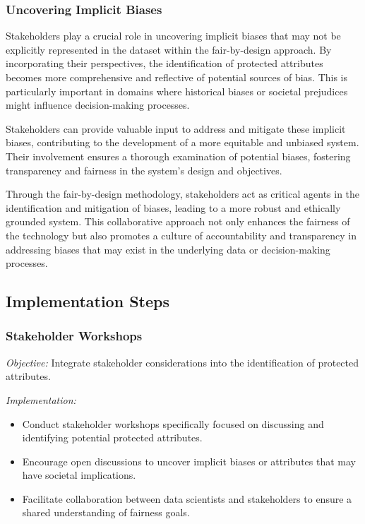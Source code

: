 \subsubsection{Uncovering Implicit Biases}


Stakeholders play a crucial role in uncovering implicit biases that may not be explicitly represented in the dataset within the fair-by-design approach. By incorporating their perspectives, the identification of protected attributes becomes more comprehensive and reflective of potential sources of bias. This is particularly important in domains where historical biases or societal prejudices might influence decision-making processes.

Stakeholders can provide valuable input to address and mitigate these implicit biases, contributing to the development of a more equitable and unbiased system. Their involvement ensures a thorough examination of potential biases, fostering transparency and fairness in the system's design and objectives.

Through the fair-by-design methodology, stakeholders act as critical agents in the identification and mitigation of biases, leading to a more robust and ethically grounded system. This collaborative approach not only enhances the fairness of the technology but also promotes a culture of accountability and transparency in addressing biases that may exist in the underlying data or decision-making processes.

\subsection{Implementation Steps}

\subsubsection{Stakeholder Workshops}

\emph{Objective:} Integrate stakeholder considerations into the identification of protected attributes.

\emph{Implementation:}

\begin{itemize}

    \item Conduct stakeholder workshops specifically focused on discussing and identifying potential protected attributes.

    \item Encourage open discussions to uncover implicit biases or attributes that may have societal implications.

    \item Facilitate collaboration between data scientists and stakeholders to ensure a shared understanding of fairness goals.

\end{itemize}

